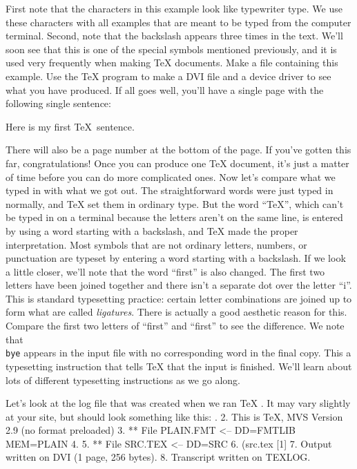 First note that the characters in this example look like 
typewriter type. We use these characters with all examples that 
are meant to be typed from the computer terminal. Second, note 
that the backslash appears three times in the text. We'll soon 
see that this is one of the special symbols mentioned 
previously, and it is used very frequently when making \TeX{} 
documents. Make a file containing this example. Use the \TeX{} 
program to make a DVI file and a device driver to see what you 
have produced. If all goes well, you'll have a single page with 
the following single sentence: 

Here is my first \TeX\ sentence. 

  There will also be a page number at the bottom of the page. If 
you've gotten this far, congratulations! Once you can produce one 
\TeX{} document, it's just a matter of time before you can do 
more complicated ones. Now let's compare what we typed in with 
what we got out. The straightforward words were just typed in 
normally, and \TeX{} set them in ordinary type. But the word ``\TeX'', 
which can't be typed in on a terminal because the letters 
aren't on the same line, is entered by using a word starting with 
a backslash, and \TeX{} made the proper interpretation. Most 
symbols that are not ordinary letters, numbers, or punctuation 
are typeset by entering a word starting with a backslash. If we 
look a little closer, we'll note that the word ``first'' is also 
changed. 
The first two letters have been joined together and there isn't 
a separate dot over the letter ``i''. This is standard 
typesetting practice: certain letter combinations are joined up 
to form what are called {\sl ligatures}. There is actually a good 
aesthetic{} reason for this. Compare the first two letters of 
``first'' and ``{f}irst'' to see the difference. We note that 
{\tt \\bye} appears in the input file with no corresponding word 
in the final copy. 
This a typesetting instruction that tells \TeX{} that the input 
is finished. We'll learn about lots of different typesetting 
instructions as we go along. 

Let's look at the log file that was created when we ran \TeX 
\null. It may vary slightly at your site, but should look 
something like this: 
. 
   2.  This is TeX, MVS Version 2.9 (no format preloaded) 
   3.   ** File  PLAIN.FMT <-- DD=FMTLIB MEM=PLAIN 
   4. 
   5.   ** File  SRC.TEX <-- DD=SRC 
   6.  (src.tex [1] 
   7.  Output written on DVI (1 page, 256 bytes). 
   8.  Transcript written on TEXLOG. 
\enduser 


